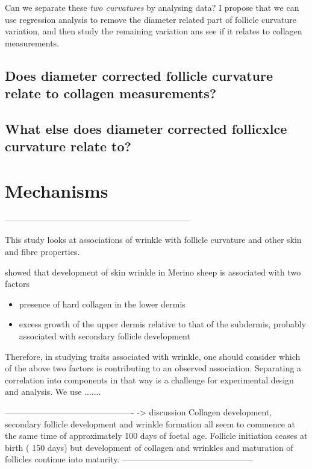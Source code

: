 \documentclass{article}
\begin{document}
Can we separate these {\em two curvatures} by analysing data?  I propose that we can use regression analysis to remove the diameter related part of follicle curvature variation, and then study the remaining variation ans see if it relates to collagen measurements.

\subsection{ Does diameter corrected follicle curvature relate to collagen measurements?}

\subsection{ What else does diameter corrected follicxlce curvature relate to?}

\section{Mechanisms}

------------------------------------------------------------------

This study looks at associations of wrinkle with follicle curvature and other skin and fibre properties. 

\cite{watts-2020} showed that development of skin wrinkle in Merino sheep is associated with two factors
\begin{itemize}
\item presence of hard collagen in the lower dermis 
\item excess growth of the upper dermis relative to that of the subdermis, probably associated with secondary follicle development
\end{itemize}

Therefore, in studying traits associated with wrinkle, one should consider which of the above two factors is contributing to an observed association. Separating a correlation into components in that way is a challenge for experimental design and analysis.  We use .......

----------------------------------------------  -> discussion
Collagen development, secondary follicle development and wrinkle formation  all seem to commence at the same time of approximately 100 days of foetal age.  Follicle initiation ceases at birth ( 150 days) but development of collagen and wrinkles  and maturation of follicles continue into maturity. 
-----------------------------------------------
\end{document}
